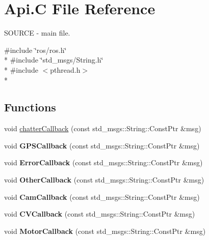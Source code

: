 \hypertarget{Api_8C}{\section{Api.\-C File Reference}
\label{Api_8C}
}


S\-O\-U\-R\-C\-E -\/ main file.  


{\ttfamily \#include \char`\"{}ros/ros.\-h\char`\"{}}\\*
{\ttfamily \#include \char`\"{}std\-\_\-msgs/\-String.\-h\char`\"{}}\\*
{\ttfamily \#include $<$pthread.\-h$>$}\\*
\subsection*{Functions}
\begin{DoxyCompactItemize}
\item 
void \hyperlink{Api_8C_ae5c0c11b4a60030ee8df1a3ae0b6f758}{chatter\-Callback} (const std\-\_\-msgs\-::\-String\-::\-Const\-Ptr \&msg)
\item 
\hypertarget{Api_8C_a38ce59a361b9595b45f8f358340511cd}{void {\bfseries G\-P\-S\-Callback} (const std\-\_\-msgs\-::\-String\-::\-Const\-Ptr \&msg)}\label{Api_8C_a38ce59a361b9595b45f8f358340511cd}

\item 
\hypertarget{Api_8C_a454ca9b8bf0da57a526dc3d1ec67063d}{void {\bfseries Error\-Callback} (const std\-\_\-msgs\-::\-String\-::\-Const\-Ptr \&msg)}\label{Api_8C_a454ca9b8bf0da57a526dc3d1ec67063d}

\item 
\hypertarget{Api_8C_ada0ab9274cab357d9df4f464d272b3a8}{void {\bfseries Other\-Callback} (const std\-\_\-msgs\-::\-String\-::\-Const\-Ptr \&msg)}\label{Api_8C_ada0ab9274cab357d9df4f464d272b3a8}

\item 
\hypertarget{Api_8C_a519247b7260f3560e1c3b06e8b4341ac}{void {\bfseries Cam\-Callback} (const std\-\_\-msgs\-::\-String\-::\-Const\-Ptr \&msg)}\label{Api_8C_a519247b7260f3560e1c3b06e8b4341ac}

\item 
\hypertarget{Api_8C_a77009212af45d6269d56d92dbadba018}{void {\bfseries C\-V\-Callback} (const std\-\_\-msgs\-::\-String\-::\-Const\-Ptr \&msg)}\label{Api_8C_a77009212af45d6269d56d92dbadba018}

\item 
\hypertarget{Api_8C_aa12c949b461f4739e395d3a646a9717e}{void {\bfseries Motor\-Callback} (const std\-\_\-msgs\-::\-String\-::\-Const\-Ptr \&msg)}\label{Api_8C_aa12c949b461f4739e395d3a646a9717e}


\end{DoxyCompactItemize}
